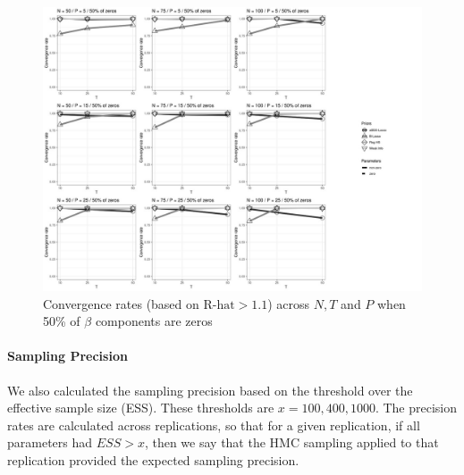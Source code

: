 \documentclass[a4paper,12pt]{article}
\begin{document}
\begin{figure}[]
\centering 
\label{fig:CVr_nz50}
\includegraphics[width=18cm]{CVr_nz50_beta.jpg}
\caption{Convergence rates (based on $\text{R-hat}>1.1$) across $N, T$ and $P$ when 50\% of $\beta$ components are zeros}
\end{figure}

\clearpage
\paragraph{Sampling Precision}
We also calculated the sampling precision based on the threshold over the effective sample size (ESS). These thresholds are $x = 100, 400, 1000$. The precision rates are calculated across replications, so that for a given replication, if all parameters had $ESS > x$, then we say that the HMC sampling applied to that replication provided the expected sampling precision.
\end{document}
